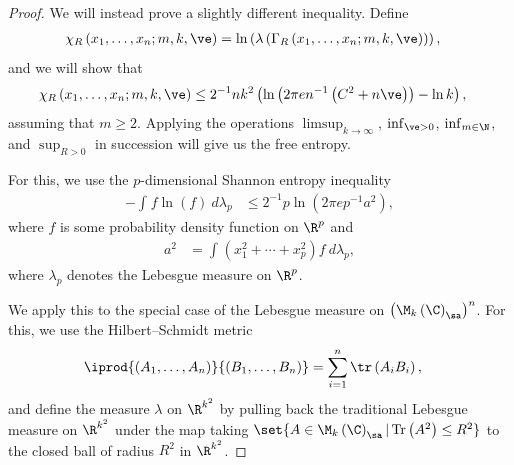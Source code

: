 \documentclass[10pt]{mypackage}
\begin{document}
\begin{proof}
  We will instead prove a slightly different inequality. Define
  \begin{align*}
    \chi_R\left( x_1,\dots,x_n;m,k,\ve \right) &= \ln \left( \lambda\left( \Gamma_{R}\left( x_1,\dots,x_n;m,k,\ve \right) \right) \right),
  \end{align*}
  and we will show that
  \begin{align*}
    \chi_R\left( x_1,\dots,x_n;m,k,\ve \right) &\leq 2^{-1}nk^2\left( \ln\left( 2\pi e n^{-1}\left( C^2 + n\ve \right) \right) - \ln k \right),
  \end{align*}
  assuming that $m\geq 2$. Applying the operations $\limsup_{k\rightarrow\infty}$, $\inf_{\ve > 0}$, $\inf_{m\in \N}$, and $\sup_{R > 0}$ in succession will give us the free entropy.

  For this, we use the $p$-dimensional Shannon entropy inequality
  \begin{align*}
    - \int_{}^{} f\ln(f)\:d\lambda_p &\leq 2^{-1}p\ln\left( 2\pi e p^{-1} a^2 \right),
  \end{align*}
  where $f$ is some probability density function on $\R^p$ and
  \begin{align*}
    a^2 &= \int_{}^{} \left( x_1^2 + \cdots + x_p^2 \right)f\:d\lambda_p,
  \end{align*}
  where $\lambda_p$ denotes the Lebesgue measure on $\R^p$.

  We apply this to the special case of the Lebesgue measure on $\left( \M_k\left( \C \right)_{\sa} \right)^{n}$. For this, we use the Hilbert--Schmidt metric
  \begin{align*}
    \iprod{\left( A_1,\dots,A_n \right)}{\left( B_1,\dots,B_n \right)} &= \sum_{i=1}^{n} \tr\left( A_iB_i \right),
  \end{align*}
  and define the measure $\lambda$ on $\R^{k^2}$ by pulling back the traditional Lebesgue measure on $\R^{k^2}$ under the map taking $\set{A\in \M_{k}\left( \C \right)_{\sa} | \operatorname{Tr}\left( A^2 \right) \leq R^2}$ to the closed ball of radius $R^2$ in $\R^{k^2}$.


\end{proof}
\end{document}
